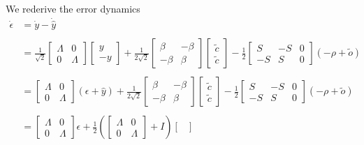 \begin{enumerate}
We rederive the error dynamics 
\begin{align*}
\dot{\epsilon} &= \dot{y} - \dot{\hat{y}}
\\
\\
&=
\frac{1}{\sqrt{2}} \begin{bmatrix}
\Lambda & 0
\\
0 & \Lambda
\end{bmatrix}
\begin{bmatrix}
y\\-y
\end{bmatrix}
+ 
\frac{1}{2\sqrt{2}}
\begin{bmatrix}
\beta & -\beta
\\
-\beta & \beta
\end{bmatrix}
\begin{bmatrix}
\tilde{c}
\\
\tilde{c}
\end{bmatrix} -
\frac{1}{2}\begin{bmatrix}
S & -S & 0
\\
-S & S & 0
\end{bmatrix} \left( -\rho + \tilde{o}\right)
\\
\\
&= 
\begin{bmatrix}
\Lambda & 0
\\
0 & \Lambda
\end{bmatrix}
\left(
\epsilon + \hat{y}
\right)
+ 
\frac{1}{2\sqrt{2}}
\begin{bmatrix}
\beta & -\beta
\\
-\beta & \beta
\end{bmatrix}
\begin{bmatrix}
\tilde{c}
\\
\tilde{c}
\end{bmatrix} -
\frac{1}{2}\begin{bmatrix}
S & -S & 0
\\
-S & S & 0
\end{bmatrix} \left( -\rho + \tilde{o}\right)
\\
\\
&=
\begin{bmatrix}
\Lambda & 0
\\
0 & \Lambda
\end{bmatrix}
\epsilon
+ 
\frac{1}{2}
\left(
\begin{bmatrix}
\Lambda & 0
\\
0 & \Lambda
\end{bmatrix}
+ I
\right)
\begin{bmatrix}

\end{bmatrix}
\end{align*}
\end{enumerate}
